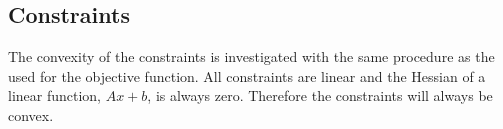 \subsection{Constraints}

The convexity of the constraints is investigated with the same procedure as the used for the objective function. All constraints are linear and the Hessian of a linear function, $Ax+b$, is always zero. Therefore the constraints will always be convex.

